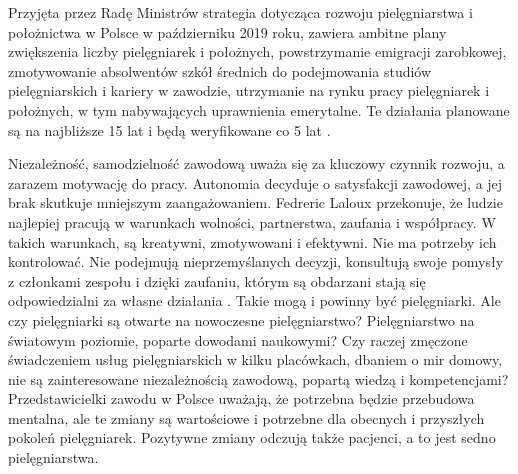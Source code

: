 \documentclass[a4paper,12pt,twoside,openany]{report}
\begin{document}
Przyjęta przez Radę Ministrów strategia dotycząca rozwoju pielęgniarstwa i położnictwa w Polsce   w październiku 2019 roku, zawiera ambitne plany zwiększenia liczby pielęgniarek i położnych, powstrzymanie emigracji zarobkowej, zmotywowanie absolwentów szkół średnich do podejmowania studiów pielęgniarskich i kariery w zawodzie, utrzymanie na rynku pracy pielęgniarek i położnych, w tym nabywających uprawnienia emerytalne. Te działania planowane są na najbliższe 15 lat i będą weryfikowane co 5 lat \cite{strategia}.

Niezależność, samodzielność zawodową uważa się za kluczowy czynnik rozwoju, a zarazem motywację do pracy. Autonomia decyduje o satysfakcji zawodowej, a jej brak skutkuje mniejszym zaangażowaniem. Fedreric Laloux przekonuje, że ludzie najlepiej pracują w warunkach wolności, partnerstwa, zaufania i współpracy. W takich warunkach, są kreatywni, zmotywowani i efektywni. Nie ma potrzeby ich kontrolować. Nie podejmują nieprzemyślanych decyzji, konsultują swoje pomysły z członkami zespołu i dzięki zaufaniu, którym są obdarzani stają się odpowiedzialni za własne działania \cite{federic}. Takie mogą i powinny być pielęgniarki. Ale czy pielęgniarki są otwarte na nowoczesne pielęgniarstwo? Pielęgniarstwo na światowym poziomie, poparte dowodami naukowymi? Czy raczej zmęczone świadczeniem usług pielęgniarskich w kilku placówkach, dbaniem o mir domowy, nie są zainteresowane niezależnością zawodową, popartą wiedzą i kompetencjami? Przedstawicielki zawodu w Polsce uważają, że potrzebna będzie przebudowa mentalna, ale te zmiany są wartościowe i potrzebne dla obecnych i przyszłych pokoleń pielęgniarek. Pozytywne zmiany odczują także pacjenci, a to jest sedno pielęgniarstwa.

\end{document}

